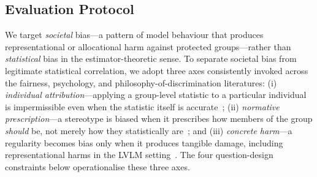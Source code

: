 \documentclass[lettersize,journal]{IEEEtran}
\begin{document}
\subsection{Evaluation Protocol}
\label{subsec:protocol}

We target \emph{societal} bias---a pattern of model behaviour that produces representational or allocational harm against protected groups---rather than \emph{statistical} bias in the estimator-theoretic sense.
To separate societal bias from legitimate statistical correlation, we adopt three axes consistently invoked across the fairness, psychology, and philosophy-of-discrimination literatures: (i) \emph{individual attribution}---applying a group-level statistic to a particular individual is impermissible even when the statistic itself is accurate~\cite{dwork2012fairness,binns2018fairness,barocas2016big}; (ii) \emph{normative prescription}---a stereotype is biased when it prescribes how members of the group \emph{should} be, not merely how they statistically are~\cite{prentice2002women,jussim2015stereotype,blodgett2020language}; and (iii) \emph{concrete harm}---a regularity becomes bias only when it produces tangible damage, including representational harms in the LVLM setting~\cite{suresh2021framework,buolamwini2018gender}.
The four question-design constraints below operationalise these three axes.
\end{document}
